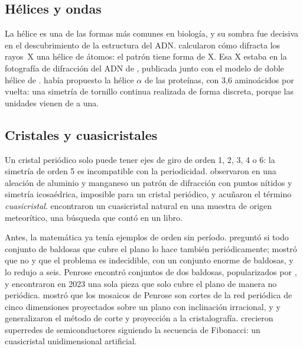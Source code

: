 \documentclass[11pt,a4paper]{article}
\begin{document}
\subsection{Hélices y ondas}

La hélice es una de las formas más comunes en biología, y su sombra fue decisiva en el descubrimiento de la estructura del ADN. \textcite{cochran1952} calcularon cómo difracta los rayos~X una hélice de átomos: el patrón tiene forma de X. Esa X estaba en la fotografía de difracción del ADN de \textcite{franklin1953}, publicada junto con el modelo de doble hélice de \textcite{watson1953}. \textcite{pauling1951} había propuesto la hélice $\alpha$ de las proteínas, con 3,6 aminoácidos por vuelta: una simetría de tornillo continua realizada de forma discreta, porque las unidades vienen de a una.

\subsection{Cristales y cuasicristales}

Un cristal periódico solo puede tener ejes de giro de orden 1, 2, 3, 4 o 6: la simetría de orden 5 es incompatible con la periodicidad. \textcite{shechtman1984} observaron en una aleación de aluminio y manganeso un patrón de difracción con puntos nítidos y simetría icosaédrica, imposible para un cristal periódico, y \textcite{levine1984} acuñaron el término \emph{cuasicristal}. \textcite{bindi2009} encontraron un cuasicristal natural en una muestra de origen meteorítico, una búsqueda que \textcite{steinhardt2019} contó en un libro.

Antes, la matemática ya tenía ejemplos de orden sin período. \textcite{wang1961} preguntó si todo conjunto de baldosas que cubre el plano lo hace también periódicamente; \textcite{berger1966} mostró que no y que el problema es indecidible, con un conjunto enorme de baldosas, y \textcite{robinson1971} lo redujo a seis. Penrose encontró conjuntos de dos baldosas, popularizados por \textcite{gardner1977}, y \textcite{smith2024} encontraron en 2023 una sola pieza que solo cubre el plano de manera no periódica. \textcite{debruijn1981} mostró que los mosaicos de Penrose son cortes de la red periódica de cinco dimensiones proyectados sobre un plano con inclinación irracional, y \textcite{kramer1984} y \textcite{duneau1985} generalizaron el método de corte y proyección a la cristalografía. \textcite{merlin1985} crecieron superredes de semiconductores siguiendo la secuencia de Fibonacci: un cuasicristal unidimensional artificial.
\end{document}
